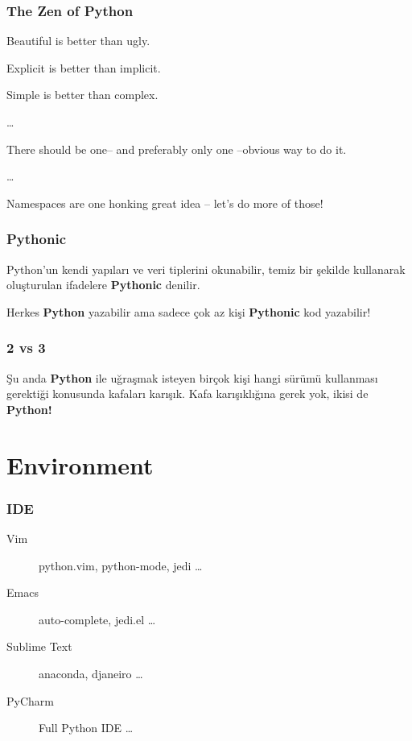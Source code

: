 \documentclass[10pt, compress]{beamer}
\begin{document}
\begin{frame}[fragile]
\frametitle{The Zen of Python}
    Beautiful is better than ugly.
    
    Explicit is better than implicit.
    
    Simple is better than complex.
    
    \ldots
    
    \alert{There should be one-- and preferably only one --obvious way to do it.}
    
    \ldots
    
    Namespaces are one honking great idea -- let's do more of those!
\end{frame}

\begin{frame}[fragile]
\frametitle{Pythonic}
    Python'un kendi yapıları ve veri tiplerini okunabilir, temiz bir şekilde kullanarak oluşturulan ifadelere \textbf{Pythonic} denilir.
    
    Herkes \textbf{Python} yazabilir ama sadece çok az kişi \textbf{Pythonic} kod yazabilir!
\end{frame}

\begin{frame}[fragile]
\frametitle{2 vs 3}
    Şu anda \textbf{Python} ile uğraşmak isteyen birçok kişi hangi sürümü kullanması gerektiği konusunda kafaları karışık. Kafa karışıklığına gerek yok, ikisi de \textbf{Python!}
\end{frame}


\section{Environment}

\begin{frame}[fragile]
\frametitle{IDE}
    \begin{description}
        \item[Vim] python.vim, python-mode, jedi \ldots
        \item[Emacs] auto-complete, jedi.el \ldots
        \item[Sublime Text] anaconda, djaneiro \ldots
        \item[PyCharm] Full Python IDE \ldots
    \end{description}
\end{frame}

\end{document}
